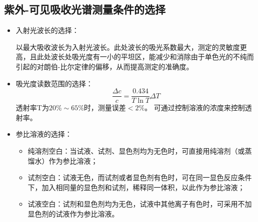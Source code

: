 \subsection{紫外-可见吸收光谱测量条件的选择}
\begin{itemize}
    \item 入射光波长的选择：
    
    以最大吸收波长为入射光波长。此处波长的吸光系数最大，测定的灵敏度更高，且此处波长处吸光度有一小的平坦区，能减少和消除由于单色光的不纯而引起的对朗伯-比尔定律的偏移，从而提高测定的准确度。
    
    \item 吸光度读数范围的选择：
    \begin{equation*}
        \frac{\Delta c}{c}=\frac{0.434}{T \ln T}\Delta T
    \end{equation*}
    透射率$\mathrm{T}$为$20\%\sim 65\%$时，测量误差$<2\%$。
    可通过控制溶液的浓度来控制透射率。
    
    \item 参比溶液的选择：
     \begin{itemize}
        \item 纯溶剂空白：当试液、试剂、显色剂均为无色时，可直接用纯溶剂（或蒸馏水）作为参比溶液；
        \item  试剂空白：试液无色，而试剂或者显色剂有色时，可在同一显色反应条件下，加入相同量的显色剂和试剂，稀释同一体积，以此作为参比溶液；
        \item  试液空白：试剂和显色剂均为无色，试液中其他离子有色时，可采用不加显色剂的试液作为参比溶液。
    \end{itemize}

\end{itemize}    